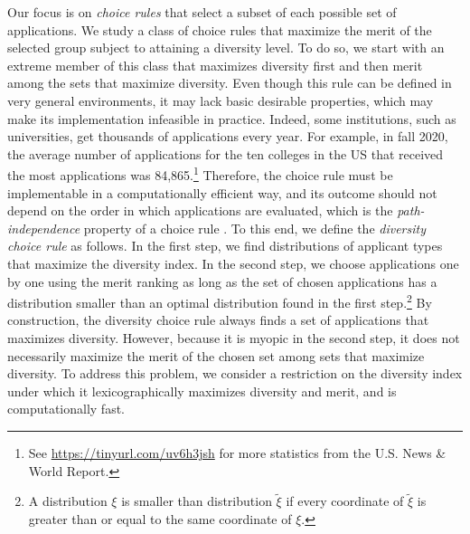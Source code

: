 \documentclass[12pt]{amsart}
\theoremstyle{remark}
\begin{document}
Our focus is on \emph{choice rules} that select a subset of each possible set of applications.
We study a class of choice rules that maximize the merit of the selected group
subject to attaining a diversity level. To do so, we start with an extreme member
of this class that maximizes diversity first and then merit among the sets
that maximize diversity. Even though this rule can be defined in very general environments, it may lack basic desirable properties, which may make its implementation infeasible in practice.
Indeed, some institutions, such as universities, get
thousands of applications every year. For example, in fall 2020, the average number
of applications for the ten colleges in the US that received the
most applications was 84,865.\footnote{See \url{https://tinyurl.com/uv6h3jsh} for
more statistics from the U.S. News \& World Report.} Therefore, the choice rule
must be implementable in a computationally efficient way, and its outcome should not
depend on the order in which applications are evaluated, which is the \emph{path-independence}
property of a choice rule \citep{plott1973path}.
To this end, we define the \emph{diversity choice rule} as follows. In the first step, we find
distributions of applicant types that maximize the diversity index. In the second
step, we choose applications one by one using the merit ranking as long as the set
of chosen applications has a distribution smaller than an optimal distribution found in the first step.\footnote{A distribution $\xi$ is smaller than distribution $\tilde \xi$ if every coordinate of $\tilde \xi$ is greater than or equal to the same coordinate of $\xi$.}
By construction, the diversity choice rule always finds a set of applications that
maximizes diversity. However, because it
is myopic in the second step, it does not necessarily maximize the merit of the
chosen set among sets that maximize diversity. To address this problem, we consider a
restriction on the diversity index under which it lexicographically maximizes diversity
and merit, and is computationally fast.
\end{document}
